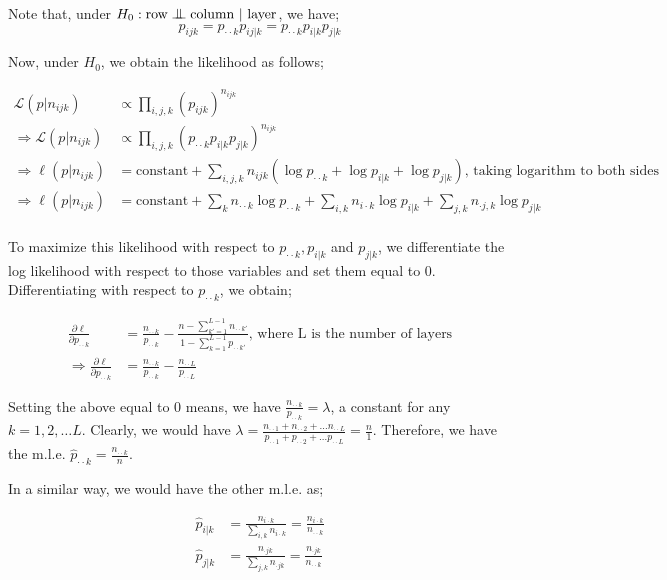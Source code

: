 \documentclass[12pt]{article}
\newcommand{\indep}{\mathrel{\text{\scalebox{1.07}{$\perp\mkern-10mu\perp$}}}}
\begin{document}
\begin{enumerate}
\begin{solution}
Note that, under $H_0 : \text{row} \indep \text{column } | \text{ layer}$, we have;
$$p_{ijk} = p_{\cdot\cdot k}p_{ij|k} = p_{\cdot\cdot k}p_{i|k}p_{j|k}$$

Now, under $H_0$, we obtain the likelihood as follows;

\begin{align*}
	\mathcal{L}(p|n_{ijk}) & \propto \prod_{i,j,k} \left(p_{ijk}\right)^{n_{ijk}}\\
	\Rightarrow \mathcal{L}(p|n_{ijk}) & \propto \prod_{i,j,k} \left(p_{\cdot\cdot k}p_{i|k}p_{j|k}\right)^{n_{ijk}}\\
	\Rightarrow \ell(p|n_{ijk}) & = \text{constant} + \sum_{i,j,k} n_{ijk}\left(\log{p_{\cdot\cdot k}} + \log{ p_{i|k}} + \log{p_{j|k}}\right)\text{, taking logarithm to both sides}\\
	\Rightarrow \ell(p|n_{ijk}) & = \text{constant} + \sum_{k} n_{\cdot\cdot k}\log{p_{\cdot\cdot k}} + \sum_{i,k}n_{i\cdot k}\log{p_{i|k}} + \sum_{j,k}n_{\cdot j,k}\log{p_{j|k}}\\
\end{align*}

To maximize this likelihood with respect to $p_{\cdot \cdot k}, p_{i|k}$ and $p_{j|k}$, we differentiate the log likelihood with respect to those variables and set them equal to 0. Differentiating with respect to $p_{\cdot \cdot k}$, we obtain;

\begin{align*}
	\frac{\partial \ell}{\partial p_{\cdot \cdot k}} & = \frac{n_{\cdot \cdot k}}{p_{\cdot \cdot k}} - \frac{n - \sum_{k'=1}^{L-1}{n_{\cdot \cdot k'}}}{1 - \sum_{k=1}^{L-1}{p_{\cdot \cdot k'}}}\text{, where L is the number of layers}\\
	\Rightarrow \frac{\partial \ell}{\partial p_{\cdot \cdot k}} & = \frac{n_{\cdot \cdot k}}{p_{\cdot \cdot k}} - \frac{n_{\cdot \cdot L}}{p_{\cdot \cdot L}}
\end{align*}

Setting the above equal to 0 means, we have $\frac{n_{\cdot \cdot k}}{p_{\cdot \cdot k}} = \lambda$, a constant for any $k = 1,2,\dots L$. Clearly, we would have $\lambda = \frac{n_{\cdot \cdot 1} + n_{\cdot \cdot 2} + \dots n_{\cdot \cdot L}}{p_{\cdot \cdot 1} + p_{\cdot \cdot 2} + \dots p_{\cdot \cdot L}} = \frac{n}{1}$. Therefore, we have the m.l.e. $\hat{p}_{\cdot \cdot k} = \frac{n_{\cdot \cdot k}}{n}$.

In a similar way, we would have the other m.l.e. as;

\begin{align*}
	\hat{p}_{i|k} & = \frac{n_{i \cdot k}}{\sum_{i,k}n_{i \cdot k}} = \frac{n_{i \cdot k}}{n_{\cdot \cdot k}}\\
	\hat{p}_{j|k} & = \frac{n_{\cdot jk}}{\sum_{j,k}n_{\cdot jk}} = \frac{n_{\cdot jk}}{n_{\cdot \cdot k}}
\end{align*}\par 


\end{solution}
\end{enumerate}
\end{document}

